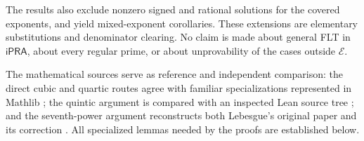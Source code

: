 \documentclass[11pt,letterpaper]{article}
\newcommand{\ipra}{\mathsf{iPRA}}
\theoremstyle{remark}
\numberwithin{equation}{section}
\begin{document}
The results also exclude nonzero signed and rational solutions for the
covered exponents, and yield mixed-exponent corollaries. These extensions
are elementary substitutions and denominator clearing. No claim is made
about general FLT in $\ipra$, about every regular prime, or about
unprovability of the cases outside $\mathcal E$.

The mathematical sources serve as reference and independent comparison:
the direct cubic and quartic routes agree with familiar specializations
represented in Mathlib \cite{mathlib3,mathlib4}; the quintic argument is
compared with an inspected Lean source tree \cite{five-source}; and the
seventh-power argument reconstructs both Lebesgue's original paper and its
correction \cite{Lebesgue1840,Lebesgue1840Add}. All specialized lemmas
needed by the proofs are established below.








\end{document}

